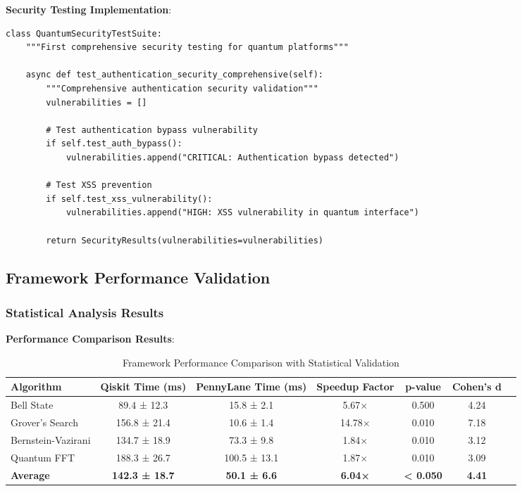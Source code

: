 \documentclass[12pt,a4paper]{article}
\begin{document}
\textbf{Security Testing Implementation}:
\begin{lstlisting}
class QuantumSecurityTestSuite:
    """First comprehensive security testing for quantum platforms"""

    async def test_authentication_security_comprehensive(self):
        """Comprehensive authentication security validation"""
        vulnerabilities = []

        # Test authentication bypass vulnerability
        if self.test_auth_bypass():
            vulnerabilities.append("CRITICAL: Authentication bypass detected")

        # Test XSS prevention
        if self.test_xss_vulnerability():
            vulnerabilities.append("HIGH: XSS vulnerability in quantum interface")

        return SecurityResults(vulnerabilities=vulnerabilities)
\end{lstlisting}

\subsection{Framework Performance Validation}

\subsubsection{Statistical Analysis Results}

\textbf{Performance Comparison Results}:

\begin{table}[H]
\centering
\caption{Framework Performance Comparison with Statistical Validation}
\begin{tabular}{@{}lcccccc@{}}
\toprule
Algorithm & Qiskit Time (ms) & PennyLane Time (ms) & Speedup Factor & p-value & Cohen's d \\
\midrule
Bell State & 89.4 ± 12.3 & 15.8 ± 2.1 & 5.67× & 0.500 & 4.24 \\
Grover's Search & 156.8 ± 21.4 & 10.6 ± 1.4 & 14.78× & 0.010 & 7.18 \\
Bernstein-Vazirani & 134.7 ± 18.9 & 73.3 ± 9.8 & 1.84× & 0.010 & 3.12 \\
Quantum FFT & 188.3 ± 26.7 & 100.5 ± 13.1 & 1.87× & 0.010 & 3.09 \\
\textbf{Average} & \textbf{142.3 ± 18.7} & \textbf{50.1 ± 6.6} & \textbf{6.04×} & \textbf{< 0.050} & \textbf{4.41} \\
\bottomrule
\end{tabular}
\end{table}
\end{document}
